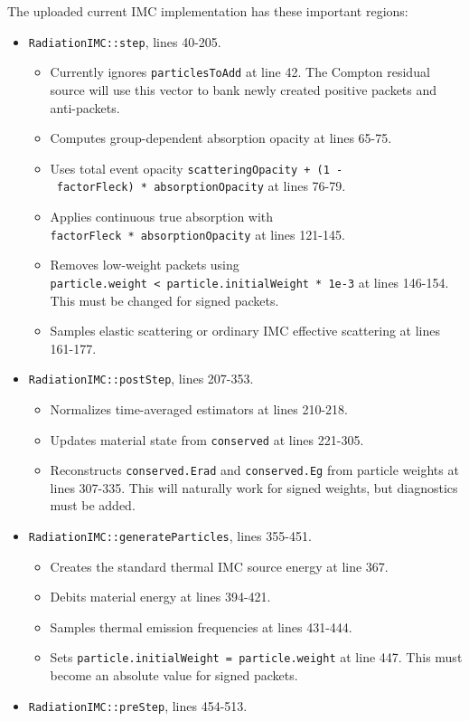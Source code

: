 \documentclass[
]{article}
\providecommand{\tightlist}{%
  \setlength{\itemsep}{0pt}\setlength{\parskip}{0pt}}
\begin{document}
The uploaded current IMC implementation has these important regions:

\begin{itemize}
\tightlist
\item
  \texttt{RadiationIMC::step}, lines 40-205.

  \begin{itemize}
  \tightlist
  \item
    Currently ignores \texttt{particlesToAdd} at line 42. The Compton
    residual source will use this vector to bank newly created positive
    packets and anti-packets.
  \item
    Computes group-dependent absorption opacity at lines 65-75.
  \item
    Uses total event opacity
    \texttt{scatteringOpacity\ +\ (1\ -\ factorFleck)\ *\ absorptionOpacity}
    at lines 76-79.
  \item
    Applies continuous true absorption with
    \texttt{factorFleck\ *\ absorptionOpacity} at lines 121-145.
  \item
    Removes low-weight packets using
    \texttt{particle.weight\ \textless{}\ particle.initialWeight\ *\ 1e-3}
    at lines 146-154. This must be changed for signed packets.
  \item
    Samples elastic scattering or ordinary IMC effective scattering at
    lines 161-177.
  \end{itemize}
\item
  \texttt{RadiationIMC::postStep}, lines 207-353.

  \begin{itemize}
  \tightlist
  \item
    Normalizes time-averaged estimators at lines 210-218.
  \item
    Updates material state from \texttt{conserved} at lines 221-305.
  \item
    Reconstructs \texttt{conserved.Erad} and \texttt{conserved.Eg} from
    particle weights at lines 307-335. This will naturally work for
    signed weights, but diagnostics must be added.
  \end{itemize}
\item
  \texttt{RadiationIMC::generateParticles}, lines 355-451.

  \begin{itemize}
  \tightlist
  \item
    Creates the standard thermal IMC source energy at line 367.
  \item
    Debits material energy at lines 394-421.
  \item
    Samples thermal emission frequencies at lines 431-444.
  \item
    Sets \texttt{particle.initialWeight\ =\ particle.weight} at line
    447. This must become an absolute value for signed packets.
  \end{itemize}
\item
  \texttt{RadiationIMC::preStep}, lines 454-513.


\end{itemize}
\end{document}
